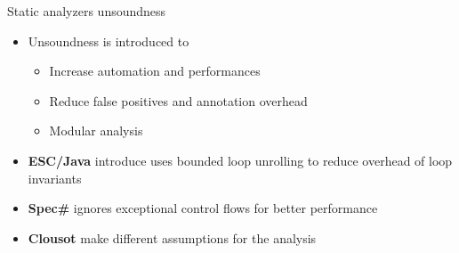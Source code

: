 \begin{frame}{Static analyzers unsoundness}

  \vspace*{-0.4cm}

  \begin{itemize}

    \item Unsoundness is introduced to
    \begin{itemize}
      \item Increase automation and performances
      \item Reduce false positives and annotation overhead
      \item Modular analysis
    \end{itemize}

    \vspace*{0.5cm}

    \item \textbf{ESC/Java} introduce uses bounded loop unrolling to reduce
    overhead of loop invariants

    \vspace*{0.5cm}

    \item \textbf{Spec\#} ignores exceptional control flows for better
    performance

    \vspace*{0.5cm}

    \item \textbf{Clousot} make different assumptions for the analysis

  \end{itemize}

\end{frame}
